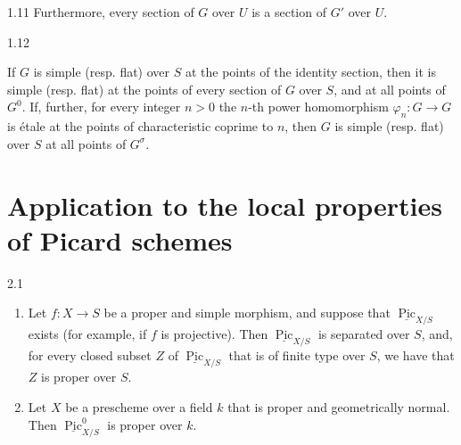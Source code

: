 \begin{proposition}{1.11}
    Furthermore, every section of \(G\) over \(U\) is a section of \(G'\) over \(U\).\end{proposition}\begin{corollary}{1.12}\label{fga3.vi-1-corollary-1.12}\skipsinglepar\par{}If \(G\) is simple (resp. flat) over \(S\) at the points of the identity section, then it is simple (resp. flat) at the points of every section of \(G\) over \(S\), and at all points of \(G^0\).
    If, further, for every integer \(n>0\) the \(n\)-th power homomorphism \(\varphi _n\colon  G\to  G\) is étale at the points of characteristic coprime to \(n\), then \(G\) is simple (resp. flat) over \(S\) at all points of \(G^\sigma \).\end{corollary}\chapter{Application to the local properties of Picard schemes}\thispagestyle{fancy}\label{fga3.vi-2}\begin{theorem}{2.1}\label{fga3.vi-2-theorem-2.1}\skipsinglepar\begin{enumerate}
    
 \item[i.]
      Let \(f\colon  X\to  S\) be a proper and simple morphism, and suppose that \(\underline {\operatorname {Pic}}_{X/S}\) exists (for example, if \(f\) is projective).
      Then \(\underline {\operatorname {Pic}}_{X/S}\) is separated over \(S\), and, for every closed subset \(Z\) of \(\underline {\operatorname {Pic}}_{X/S}\) that is of finite type over \(S\), we have that \(Z\) is proper over \(S\).
    

    
 \item[ii.]
      Let \(X\) be a prescheme over a field \(k\) that is proper and geometrically normal.
      Then \(\underline {\operatorname {Pic}}_{X/S}^0\) is proper over \(k\).
    


\end{enumerate}
\end{theorem}

